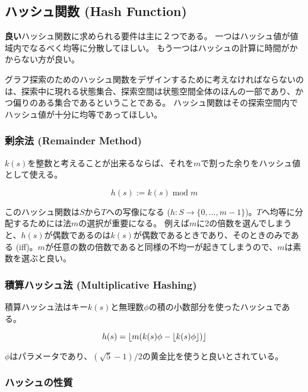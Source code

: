 \subsection{ハッシュ関数 (Hash Function)}
\label{sec:hash-function}

{\bf 良い}ハッシュ関数に求められる要件は主に２つである。
一つはハッシュ値が値域内でなるべく均等に分散してほしい。
もう一つはハッシュの計算に時間がかからない方が良い。

グラフ探索のためのハッシュ関数をデザインするために考えなければならないのは、探索中に現れる状態集合、探索空間は状態空間全体のほんの一部であり、かつ偏りのある集合であるということである。
ハッシュ関数はその探索空間内でハッシュ値が十分に均等であってほしい。


\subsubsection{剰余法 (Remainder Method)}

$k(s)$を整数と考えることが出来るならば、それを$m$で割った余りをハッシュ値として使える。

\begin{equation}
  h(s) := k(s) \; \text{mod} \; m
\end{equation}
  
このハッシュ関数は$S$から$T$への写像になる ($h: S \rightarrow \{0, ..., m-1\}$)。$T$へ均等に分配するためには法$m$の選択が重要になる。
例えば$m$に2の倍数を選んでしまうと、$h(s)$が偶数であるのは$k(s)$が偶数であるときであり、そのときのみである (iff)。$m$が任意の数の倍数であると同様の不均一が起きてしまうので、$m$は素数を選ぶと良い。


\subsubsection{積算ハッシュ法 (Multiplicative Hashing)}
積算ハッシュ法はキー$k(s)$と無理数$\phi$の積の小数部分を使ったハッシュである。

\begin{equation}
	h(s) = \lfloor m (k(s) \phi - \lfloor k(s) \phi\rfloor)\rfloor
\end{equation}

$\phi$はパラメータであり、$(\sqrt{5} - 1) / 2$の黄金比を使うと良いとされている。

\subsubsection{ハッシュの性質}

